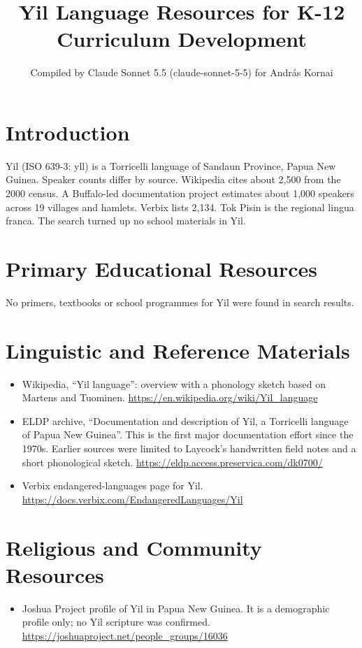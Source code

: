 \documentclass[12pt]{article}
\title{Yil Language Resources for K-12 Curriculum Development}
\author{Compiled by Claude Sonnet 5.5 (claude-sonnet-5-5) for Andr\'as Kornai}
\date{}
\begin{document}
\maketitle

\section{Introduction}
Yil (ISO 639-3: yll) is a Torricelli language of Sandaun Province, Papua New Guinea. Speaker counts differ by source. Wikipedia cites about 2,500 from the 2000 census. A Buffalo-led documentation project estimates about 1,000 speakers across 19 villages and hamlets. Verbix lists 2,134. Tok Pisin is the regional lingua franca. The search turned up no school materials in Yil.

\section{Primary Educational Resources}
No primers, textbooks or school programmes for Yil were found in search results.

\section{Linguistic and Reference Materials}
\begin{itemize}
\item Wikipedia, ``Yil language'': overview with a phonology sketch based on Martens and Tuominen. \url{https://en.wikipedia.org/wiki/Yil_language}
\item ELDP archive, ``Documentation and description of Yil, a Torricelli language of Papua New Guinea''. This is the first major documentation effort since the 1970s. Earlier sources were limited to Laycock's handwritten field notes and a short phonological sketch. \url{https://eldp.access.preservica.com/dk0700/}
\item Verbix endangered-languages page for Yil. \url{https://docs.verbix.com/EndangeredLanguages/Yil}
\end{itemize}

\section{Religious and Community Resources}
\begin{itemize}
\item Joshua Project profile of Yil in Papua New Guinea. It is a demographic profile only; no Yil scripture was confirmed. \url{https://joshuaproject.net/people_groups/16036}
\end{itemize}
\end{document}
